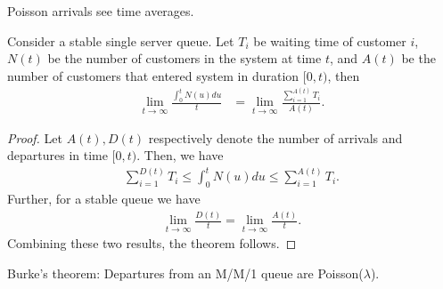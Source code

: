 \documentclass[a4paper,10pt,english]{article}
\begin{document}
\begin{thm}[PASTA] Poisson arrivals see time averages.
\end{thm}
\begin{thm} Consider a stable single server queue. Let $T_i$ be waiting time of customer $i$, $N(t)$ be the number of customers in the system at time $t$, and $A(t)$ be the number of customers that entered system in duration $[0,t)$, then
\begin{align*}
\lim_{t \to \infty}\frac{\int_{0}^tN(u)du}{t} &= \lim_{t \to \infty} \frac{\sum_{i=1}^{A(t)}T_i}{A(t)}.
\end{align*} 
\end{thm}
\begin{proof}
Let $A(t), D(t)$ respectively denote the number of arrivals and departures in time $[0,t)$. Then, we have 
\begin{align*}
\sum_{i=1}^{D(t)}T_i \leq \int_{0}^tN(u)du \leq \sum_{i=1}^{A(t)}T_i.
\end{align*}
Further, for a stable queue we have
\begin{align*}
\lim_{t \to \infty}\frac{D(t)}{t} = \lim_{t \to \infty}\frac{A(t)}{t}.
\end{align*}
Combining these two results, the theorem follows.
\end{proof}

\begin{thm}
Burke's theorem: Departures from an M/M/1 queue are Poisson($\lambda$).
\end{thm}


\end{document}
